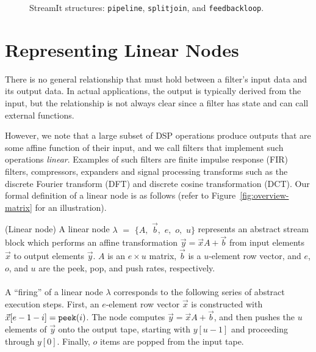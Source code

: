 \begin{figure}[t]
\vspace{-6pt}
\center
\epsfxsize=3.0in
\vspace{-12pt}
\caption{StreamIt structures: {\tt pipeline}, {\tt splitjoin}, and {\tt feedbackloop}.
\protect\label{fig:structures}}
\vspace{-12pt}
\end{figure}

\section{Representing Linear Nodes}
\label{sec:linearrep}

There is no general relationship that must hold between a
filter's input data and its output data. In actual applications, the
output is typically derived from the input, but the relationship is
not always clear since a filter has state and can call external
functions.

However, we note that a large subset of DSP operations produce outputs
that are some affine function of their input, and we call
filters that implement such operations {\it linear}. Examples of such
filters are finite impulse response (FIR) filters, compressors,
expanders and signal processing transforms such as the discrete
Fourier transform (DFT) and discrete cosine transformation (DCT).  Our
formal definition of a linear node is as follows (refer to
Figure~\ref{fig:overview-matrix} for an illustration). 
\vspace{-4pt}
\begin{definition}(Linear node)
A linear node $\lambda$ $=$ $\{A,$ $\vec{b},$ $e,$ $o,$ $u\}$
represents an abstract stream block which performs an affine
transformation $\vec{y} = \vec{x} A + \vec{b}$ from input elements 
$\vec{x}$ to output elements $\vec{y}$. $A$ is an $e \times u$ matrix, $\vec{b}$ is a
$u$-element row vector, and $e$, $o$, and $u$ are the peek, pop, and
push rates, respectively. \\ ~ \vspace{-8pt} \\

A ``firing'' of a linear node $\lambda$ corresponds to the following
series of abstract execution steps.  First, an $e$-element row vector
$\vec{x}$ is constructed with $\vec{x}[e-1-i] = \mbox{\tt peek}(i)$.  The node
computes $\vec{y} = \vec{x} A + {\vec b}$, and then pushes the $u$ elements 
of $\vec{y}$ onto the output tape, starting with $y[u-1]$ and proceeding through $y[0]$.
Finally, $o$ items are popped from the input tape.
\end{definition} \vspace{-2pt}

